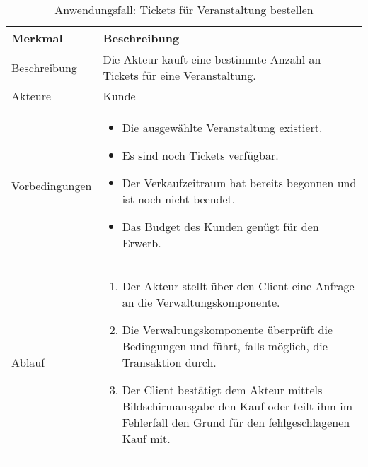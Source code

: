 \begin{table}[H]
    \centering
    \caption{Anwendungsfall: Tickets für Veranstaltung bestellen}
    \label{tab:use_case_purchase_tickets}
    \begin{tabularx}{\textwidth}{lX}
        \toprule
        \textbf{Merkmal} & \textbf{Beschreibung}  \\ \midrule
        Beschreibung    &  Die Akteur kauft eine bestimmte Anzahl an Tickets für eine Veranstaltung. \\
        Akteure         &  Kunde \\
        Vorbedingungen  &  \begin{minipage}[t]{\linewidth}
        \vspace*{-3mm}
        \begin{itemize}[leftmargin=*,nosep,after=\strut]
            \item Die ausgewählte Veranstaltung existiert.
            \item Es sind noch Tickets verfügbar.
            \item Der Verkaufzeitraum hat bereits begonnen und ist noch nicht beendet.
            \item Das Budget des Kunden genügt für den Erwerb.
        \end{itemize}
        \end{minipage} \\
        Ablauf          & \begin{minipage}[t]{\linewidth}
        \vspace*{-3mm}
        \begin{enumerate}[leftmargin=*,nosep,after=\strut]
            \item Der Akteur stellt über den Client eine Anfrage an die Verwaltungskomponente.
            \item Die Verwaltungskomponente überprüft die Bedingungen und führt, falls möglich, die Transaktion durch.
            \item Der Client bestätigt dem Akteur mittels Bildschirmausgabe den Kauf oder teilt ihm im Fehlerfall den Grund für den fehlgeschlagenen Kauf mit.
        \end{enumerate}
        \end{minipage} \\\bottomrule
    \end{tabularx}    
\setlength\belowcaptionskip{4pt}
\end{table}

